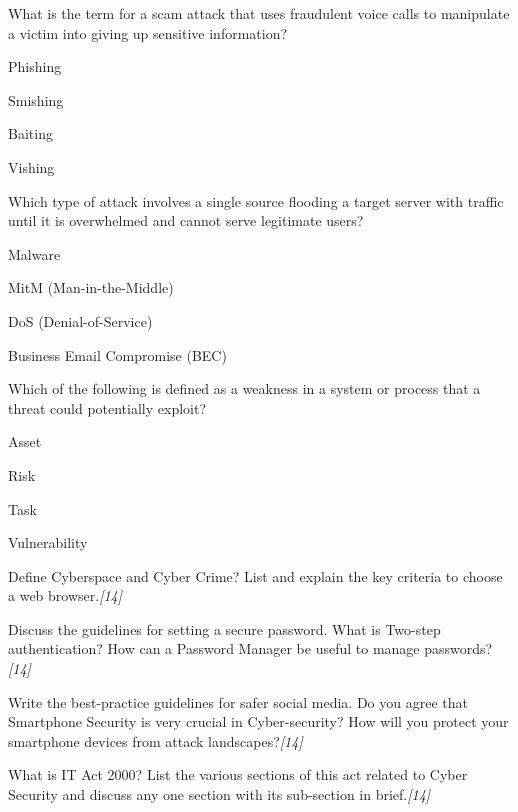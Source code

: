 \documentclass[11pt,a4paper]{article}
\newcommand{\pts}[1]{\hfill \textit{[#1]}}
\begin{document}
\begin{enumerate}[label=\textbf{\arabic*.},leftmargin=*,itemsep=12pt]
\begin{parts}
    \item What is the term for a scam attack that uses fraudulent voice calls to manipulate a victim into giving up sensitive information?
      \begin{parts}
        \item Phishing
        \item Smishing
        \item Baiting
        \item Vishing
      \end{parts}

    \item Which type of attack involves a single source flooding a target server with traffic until it is overwhelmed and cannot serve legitimate users?
      \begin{parts}
        \item Malware
        \item MitM (Man-in-the-Middle)
        \item DoS (Denial-of-Service)
        \item Business Email Compromise (BEC)
      \end{parts}

    \item Which of the following is defined as a weakness in a system or process that a threat could potentially exploit?
      \begin{parts}
        \item Asset
        \item Risk
        \item Task
        \item Vulnerability
      \end{parts}
  \end{parts}

  \item Define Cyberspace and Cyber Crime? List and explain the key criteria to choose a web browser.\pts{14}

  \item Discuss the guidelines for setting a secure password. What is Two-step authentication? How can a Password Manager be useful to manage passwords?\pts{14}

  \item Write the best-practice guidelines for safer social media. Do you agree that Smartphone Security is very crucial in Cyber-security? How will you protect your smartphone devices from attack landscapes?\pts{14}

  \item What is IT Act 2000? List the various sections of this act related to Cyber Security and discuss any one section with its sub-section in brief.\pts{14}


\end{enumerate}
\end{document}
